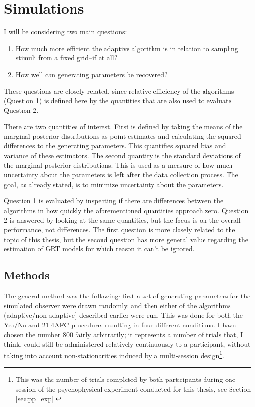 \documentclass{article}\usepackage{knitr}
\begin{document}

\section{Simulations}
\label{sec:simulations}

I will be considering two main questions: 

\begin{enumerate}
  \item How much more efficient the adaptive algorithm is in relation to sampling stimuli from a fixed grid--if at all? 
  \item How well can generating parameters be recovered?
\end{enumerate}

These questions are closely related, since relative efficiency of the algorithms (Question 1) is defined here by the quantities that are also used to evaluate Question 2. 

There are two quantities of interest. First is defined by taking the means of the marginal posterior distributions as point estimates and calculating the squared differences to the generating parameters. This quantifies squared bias and variance of these estimators. The second quantity is the standard deviations of the marginal posterior distributions. This is used as a measure of how much uncertainty about the parameters is left after the data collection process. The goal, as already stated, is to minimize uncertainty about the parameters.

Question 1 is evaluated by inspecting if there are differences between the algorithms in how quickly the aforementioned quantities approach zero. Question 2 is answered by looking at the same  quantities, but the focus is on the overall performance, not differences. The first question is more closely related to the topic of this thesis, but the second question has more general value regarding the estimation of GRT models for which reason it can't be ignored. 

\subsection{Methods}

The general method was the following: first a set of generating parameters for the simulated observer were drawn randomly, and then either of the algorithms (adaptive/non-adaptive) described earlier were run. This was done for both the Yes/No and 21-4AFC procedure, resulting in four different conditions. I have chosen the number 800 fairly arbitrarily; it represents a number of trials that, I think, could still be administered relatively continuously to a participant, without taking into account non-stationarities induced by a multi-session design\footnote{This was the number of trials completed by both participants during one session of the psychophysical experiment conducted for this thesis, see Section \ref{sec:pp_exp} \textit{}}. 
\end{document}
